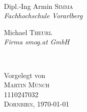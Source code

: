 \begin{titlepage}
\begin{center}
\begin{minipage}{0.48\textwidth}
\begin{center}
\end{center}
\end{minipage}
\\[0.8cm]

\begin{minipage}{0.48\textwidth}
\begin{center} \large

Dipl.-Ing Armin \textsc{Simma} \\ %
\emph{Fachhochschule Vorarlberg}

\end{center}
\end{minipage}
\hfill
\begin{minipage}{0.48\textwidth}
\begin{center} \large

Michael \textsc{Theurl} \\ %
\emph{Firma smog.at GmbH} 

\end{center}
\end{minipage}
\\ [3cm]


%


\vspace*{\fill}

Vorgelegt von\\ [0.4cm]
\textsc{\Large Martin Münch}\\
1110247032 \\[2cm]

\textsc{ \large Dornbirn, \today}
\vfill %

\end{center}

\end{titlepage}

